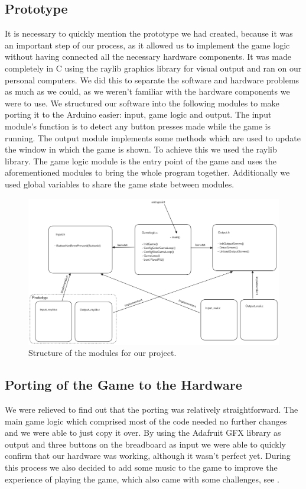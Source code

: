 \documentclass[10pt, a4paper]{article}
\begin{document}
\subsection*{Prototype}

It is necessary to quickly mention the prototype we had created, because it was an important step of our process, as it allowed us to implement the game logic without having connected all the necessary hardware components. It was made completely in C using the raylib graphics library for visual output and ran on our personal computers. We did this to separate the software and hardware problems as much as we could, as we weren't familiar with the hardware components we were to use. We structured our software into the following modules to make porting it to the Arduino easier: input, game logic and output. The input module's function is to detect any button presses made while the game is running. The output module implements some methods which are used to update the window in which the game is shown. To achieve this we used the raylib library. The game logic module is the entry point of the game and uses the aforementioned modules to bring the whole program together. Additionally we used global variables to share the game state between modules.

\begin{figure}[h]
\centering
\includegraphics[width=\textwidth]{module_structure.png}
\caption{Structure of the modules for our project.}
\end{figure}


\subsection*{Porting of the Game to the Hardware}
We were relieved to find out that the porting was relatively straightforward. The main game logic which comprised most of the code needed no further changes and we were able to just copy it over. By using the Adafruit GFX library as output and three buttons on the breadboard as input we were able to quickly confirm that our hardware was working, although it wasn't perfect yet. During this process we also decided to add some music to the game to improve the experience of playing the game, which also came with some challenges, see .
\end{document}
